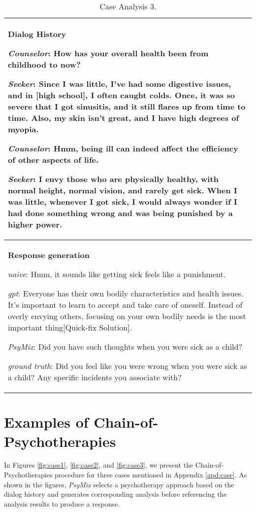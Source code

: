 \begin{table*}[htbp]
    \centering
    \begin{tabular}{|p{15.5cm}|}
    \hline
    \textbf{Dialog History} 
    \par \textit{Counselor}: How has your overall health been from childhood to now?
    \par \textit{Seeker}: Since I was little, I've had some digestive issues, and in [high school], I often caught colds. Once, it was so severe that I got sinusitis, and it still flares up from time to time. Also, my skin isn't great, and I have high degrees of myopia.
    \par \textit{Counselor}: Hmm, being ill can indeed affect the efficiency of other aspects of life.
    \par \textit{Seeker}: I envy those who are physically healthy, with normal height, normal vision, and rarely get sick. When I was little, whenever I got sick, I would always wonder if I had done something wrong and was being punished by a higher power.
    \\
    \hline
    \textbf{Response generation} 
    \par \textit{naive}: \textcolor{blue!50!black}{Hmm, it sounds like getting sick feels like a punishment.}
    \par \textit{gpt}: Everyone has their own bodily characteristics and health issues. It's important to learn to accept and take care of oneself. Instead of overly envying others, focusing on your own bodily needs is the most important thing\textcolor{red!50!black}{[Quick-fix Solution]}.
    \par \textit{PsyMix}: \textcolor{green!50!black}{Did you have such thoughts when you were sick as a child?}
    \par \textit{ground truth}: \textcolor{green!50!black}{Did you feel like you were wrong when you were sick as a child? Any specific incidents you associate with?}
    \\
    \hline
    \end{tabular}
    \caption{Case Analysis 3.} 
    \label{tab:case_anapysis_3}
\end{table*}





\section{Examples of Chain-of-Psychotherapies}
In Figures \ref{fig:case1}, \ref{fig:case2}, and \ref{fig:case3}, we present the Chain-of-Psychotherapies procedure for three cases mentioned in Appendix \ref{apd:case}. As shown in the figures, \textit{PsyMix} selects a psychotherapy approach based on the dialog history and generates corresponding analysis before referencing the analysis results to produce a response. 

